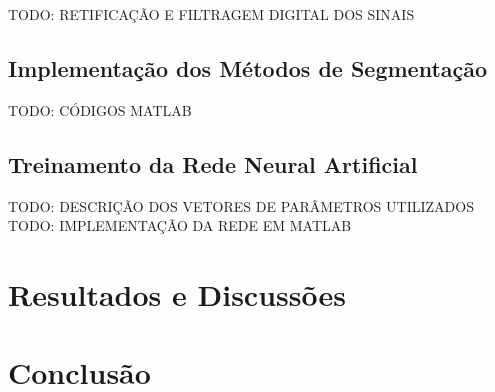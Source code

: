 \documentclass[
	12pt,				%
	openright,			%
	oneside,
	a4paper,			%
	english,			%
	francais,			%
	spanish,			%
	brazil				%
	]{abntex2}
\begin{document}
	TODO: RETIFICAÇÃO E FILTRAGEM DIGITAL DOS SINAIS

\section{Implementação dos Métodos de Segmentação}

	TODO: CÓDIGOS MATLAB

\section{Treinamento da Rede Neural Artificial}

	TODO: DESCRIÇÃO DOS VETORES DE PARÂMETROS UTILIZADOS
	TODO: IMPLEMENTAÇÃO DA REDE EM MATLAB

\chapter{Resultados e Discussões}



\chapter{Conclusão}

\postextual


\end{document}
